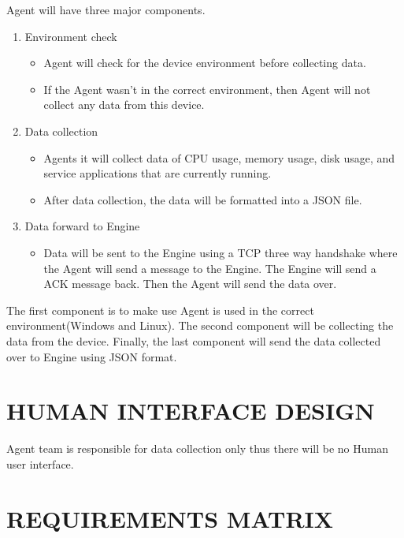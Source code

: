 \documentclass[letterpaper,12pt,oneside,listof=totoc]{scrreprt}
\begin{document}
Agent will have three major components. 
\begin{enumerate}
\item Environment check
    \begin{itemize}
        \item Agent will check for the device environment before collecting data.
        \item If the Agent wasn't in the correct environment, then Agent will not collect any data from this device.
    \end{itemize}
\item Data collection
    \begin{itemize}
        \item Agents it will collect data of CPU usage, memory usage, disk usage, and service applications that are currently running.
        \item After data collection, the data will be formatted into a JSON file.
    \end{itemize}
\item Data forward to Engine
    \begin{itemize}
        \item Data will be sent to the Engine using a TCP three way handshake where the Agent will send a message to the Engine. The Engine will send a ACK message back. Then the Agent will send the data over. 
    \end{itemize}


\end{enumerate}

The first component is to make use Agent is used in the correct environment(Windows and Linux). The second component will be collecting the data from the device. Finally, the last component will send the data collected over to Engine using JSON format. 


\chapter{HUMAN INTERFACE DESIGN}

Agent team is responsible for data collection only thus there will be no Human user interface.


\chapter{REQUIREMENTS MATRIX}

\end{document}
